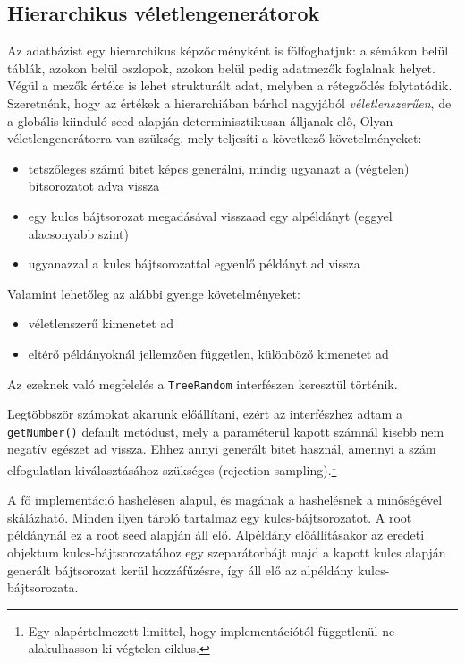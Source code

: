 \documentclass[
    parspace,
    noindent,
    nohyp,
]{elteiktdk}[2023/04/10]
\begin{document}
\subsection{Hierarchikus véletlengenerátorok}

Az adatbázist egy hierarchikus képződményként is fölfoghatjuk:
a sémákon belül táblák, azokon belül oszlopok,
azokon belül pedig adatmezők foglalnak helyet.
Végül a mezők értéke is lehet strukturált adat, melyben a rétegződés folytatódik.
Szeretnénk, hogy az értékek a hierarchiában bárhol nagyjából \textit{véletlenszerűen},
de a globális kiinduló seed alapján determinisztikusan álljanak elő,
Olyan véletlengenerátorra van szükség,
mely teljesíti a következő követelményeket:

\begin{itemize}
    \item tetszőleges számú bitet képes generálni, mindig ugyanazt a (végtelen) bitsorozatot adva vissza
   \item egy kulcs bájtsorozat megadásával visszaad egy alpéldányt (eggyel alacsonyabb szint)
   \item ugyanazzal a kulcs bájtsorozattal egyenlő példányt ad vissza
\end{itemize}

Valamint lehetőleg az alábbi gyenge követelményeket:

\begin{itemize}
   \item véletlenszerű kimenetet ad
   \item eltérő példányoknál jellemzően független, különböző kimenetet ad
\end{itemize}

Az ezeknek való megfelelés a \texttt{TreeRandom} interfészen keresztül történik.

Legtöbbször számokat akarunk előállítani,
ezért az interfészhez adtam a \texttt{getNumber()} default metódust,
mely a paraméterül kapott számnál kisebb nem negatív egészet ad vissza.
Ehhez annyi generált bitet használ,
amennyi a szám elfogulatlan kiválasztásához szükséges (rejection sampling).\footnote{
  Egy alapértelmezett limittel, hogy implementációtól függetlenül ne alakulhasson ki végtelen ciklus.
}

A fő implementáció hashelésen alapul, és magának a hashelésnek a minőségével skálázható.
Minden ilyen tároló tartalmaz egy kulcs-bájtsorozatot.
A root példánynál ez a root seed alapján áll elő.
Alpéldány előállításakor az eredeti objektum kulcs-bájtsorozatához egy szeparátorbájt
majd a kapott kulcs alapján generált bájtsorozat kerül hozzáfűzésre,
így áll elő az alpéldány kulcs-bájtsorozata.
\end{document}
